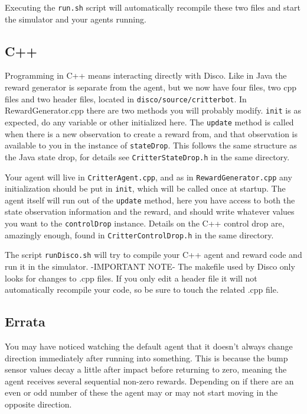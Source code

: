 \documentclass[12pt]{article}
\begin{document}
Executing the \verb+run.sh+ script will automatically recompile these two files and start the simulator and your agents running.

\subsection{C++}\label{subsec:cpp_agent}

Programming in C++ means interacting directly with Disco.  Like in Java the reward generator is separate from the agent, but we now have four files, two cpp files and two header files, located in \verb+disco/source/critterbot+.  In RewardGenerator.cpp there are two methods you will probably modify.  \verb+init+ is as expected, do any variable or other initialized here.  The \verb+update+ method is called when there is a new observation to create a reward from, and that observation is available to you in the instance of \verb+stateDrop+.  This follows the same structure as the Java state drop, for details see \verb+CritterStateDrop.h+ in the same directory.

Your agent will live in \verb+CritterAgent.cpp+, and as in \verb+RewardGenerator.cpp+ any initialization should be put in \verb+init+, which will be called once at startup.  The agent itself will run out of the \verb+update+ method, here you have access to both the state observation information and the reward, and should write whatever values you want to the \verb+controlDrop+ instance.  Details on the C++ control drop are, amazingly enough, found in \verb+CritterControlDrop.h+ in the same directory.

The script \verb+runDisco.sh+ will try to compile your C++ agent and reward code and run it in the simulator.  -IMPORTANT NOTE-  The makefile used by Disco only looks for changes to .cpp files.  If you only edit a header file it will not automatically recompile your code, so be sure to touch the related .cpp file.

\subsection{Errata}\label{subsec:programming_exercises}

You may have noticed watching the default agent that it doesn't always change direction immediately after running into something.  This is because the bump sensor values decay a little after impact before returning to zero, meaning the agent receives several sequential non-zero rewards.  Depending on if there are an even or odd number of these the agent may or may not start moving in the opposite direction.
\end{document}
